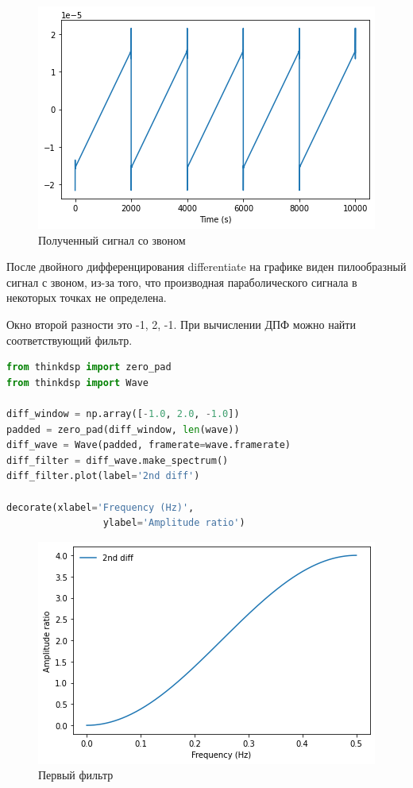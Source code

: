 \begin{figure}[H]
	\begin{center}
		\includegraphics[scale=1]{fig/lab09/lab09_13.png}
		\caption{Полученный сигнал со звоном}
	\end{center}
\end{figure}
После двойного дифференцирования differentiate на графике виден пилообразный сигнал с звоном, из-за того, что производная параболического сигнала в некоторых точках не определена.

Окно второй разности это -1, 2, -1. При вычислении ДПФ можно найти соответствующий фильтр.

\begin{lstlisting}[language=Python]
from thinkdsp import zero_pad
from thinkdsp import Wave

diff_window = np.array([-1.0, 2.0, -1.0])
padded = zero_pad(diff_window, len(wave))
diff_wave = Wave(padded, framerate=wave.framerate)
diff_filter = diff_wave.make_spectrum()
diff_filter.plot(label='2nd diff')

decorate(xlabel='Frequency (Hz)',
                 ylabel='Amplitude ratio')
\end{lstlisting}

\begin{figure}[H]
	\begin{center}
		\includegraphics[scale=1]{fig/lab09/lab09_14.png}
		\caption{Первый фильтр}
	\end{center}
\end{figure}

